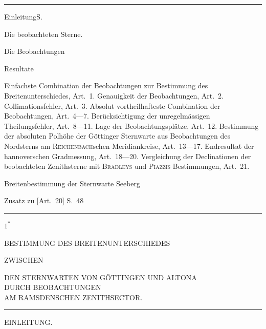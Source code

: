\clearpage
\begin{center}
{\LARGE{}}\par\medskip
\rule{.09\textwidth}{.4pt}
\end{center}
\noindent Einleitung\dotfill S.\par
\noindent{}\quad Die beobachteten Sterne.\dotfill \quotedblbase{}\par
\noindent{}\quad Die Beobachtungen\dotfill \quotedblbase{}\par
\noindent{}\quad Resultate\dotfill \quotedblbase{}\par
\noindent\hspace*{12mm}\begin{minipage}{\dimexpr\textwidth-24mm\relax}
Einfachste Combination der Beobachtungen zur Bestimmung des
Breitenunterschiedes, Art.\ 1. Genauigkeit der Beobachtungen,
Art.\ 2. Collimationsfehler, Art.\ 3. Absolut vortheilhafteste Combination
der Beobachtungen, Art.\ 4---7. Berücksichtigung der
unregelmässigen Theilungsfehler, Art.\ 8---11. Lage der Beobachtungsplätze,
Art.\ 12. Bestimmung der absoluten Polhöhe der
Göttinger Sternwarte aus Beobachtungen des Nordsterns am
\textsc{Reichenbach}schen Meridiankreise, Art.\ 13---17. Endresultat der
hannoverschen Gradmessung, Art.\ 18---20. Vergleichung der
Declinationen der beobachteten Zenithsterne mit \textsc{Bradleys} und
\textsc{Piazzis} Bestimmungen, Art.\ 21.
\end{minipage}\par
\noindent{}\quad Breitenbestimmung der Sternwarte Seeberg\dotfill \quotedblbase{}\par
\noindent Zusatz zu [Art.\ 20] S.\ 48\dotfill \quotedblbase{}\par
\begin{center}\rule{.23\textwidth}{.4pt}\end{center}
\vfill\begin{flushright}$1^{\ast}$\end{flushright}

\clearpage
\null

\clearpage
\vspace*{12mm}
\begin{center}
{\large BESTIMMUNG DES BREITENUNTERSCHIEDES}\par\medskip
{\small ZWISCHEN}\par\medskip
{\large DEN STERNWARTEN VON GÖTTINGEN UND ALTONA\\
DURCH BEOBACHTUNGEN\\
AM RAMSDENSCHEN ZENITHSECTOR.}\par\medskip
\rule{.12\textwidth}{.4pt}\par\bigskip
{\large EINLEITUNG.}
\end{center}

